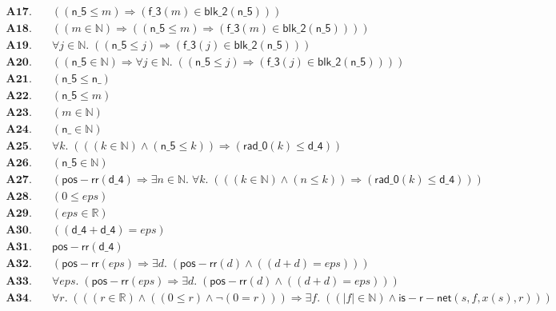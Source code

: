 \documentclass[11pt]{article}
\begin{document}
\begin{align*}
  \mathbf{A17.}\quad & ((\mathsf{n\_5} \leq m) \Rightarrow (\mathsf{f\_3}(m) \in \mathsf{blk\_2}(\mathsf{n\_5}))) \\
  \mathbf{A18.}\quad & ((m \in \mathbb{N}) \Rightarrow ((\mathsf{n\_5} \leq m) \Rightarrow (\mathsf{f\_3}(m) \in \mathsf{blk\_2}(\mathsf{n\_5})))) \\
  \mathbf{A19.}\quad & \forall j \in \mathbb{N}.\; ((\mathsf{n\_5} \leq j) \Rightarrow (\mathsf{f\_3}(j) \in \mathsf{blk\_2}(\mathsf{n\_5}))) \\
  \mathbf{A20.}\quad & ((\mathsf{n\_5} \in \mathbb{N}) \Rightarrow \forall j \in \mathbb{N}.\; ((\mathsf{n\_5} \leq j) \Rightarrow (\mathsf{f\_3}(j) \in \mathsf{blk\_2}(\mathsf{n\_5})))) \\
  \mathbf{A21.}\quad & (\mathsf{n\_5} \leq \mathsf{n\_}) \\
  \mathbf{A22.}\quad & (\mathsf{n\_5} \leq m) \\
  \mathbf{A23.}\quad & (m \in \mathbb{N}) \\
  \mathbf{A24.}\quad & (\mathsf{n\_} \in \mathbb{N}) \\
  \mathbf{A25.}\quad & \forall k.\; (((k \in \mathbb{N}) \wedge (\mathsf{n\_5} \leq k)) \Rightarrow (\mathsf{rad\_0}(k) \leq \mathsf{d\_4})) \\
  \mathbf{A26.}\quad & (\mathsf{n\_5} \in \mathbb{N}) \\
  \mathbf{A27.}\quad & (\mathsf{pos{-}rr}(\mathsf{d\_4}) \Rightarrow \exists n \in \mathbb{N}.\; \forall k.\; (((k \in \mathbb{N}) \wedge (n \leq k)) \Rightarrow (\mathsf{rad\_0}(k) \leq \mathsf{d\_4}))) \\
  \mathbf{A28.}\quad & (0 \leq \mathit{eps}) \\
  \mathbf{A29.}\quad & (\mathit{eps} \in \mathbb{R}) \\
  \mathbf{A30.}\quad & ((\mathsf{d\_4} + \mathsf{d\_4}) = \mathit{eps}) \\
  \mathbf{A31.}\quad & \mathsf{pos{-}rr}(\mathsf{d\_4}) \\
  \mathbf{A32.}\quad & (\mathsf{pos{-}rr}(\mathit{eps}) \Rightarrow \exists d.\; (\mathsf{pos{-}rr}(d) \wedge ((d + d) = \mathit{eps}))) \\
  \mathbf{A33.}\quad & \forall \mathit{eps}.\; (\mathsf{pos{-}rr}(\mathit{eps}) \Rightarrow \exists d.\; (\mathsf{pos{-}rr}(d) \wedge ((d + d) = \mathit{eps}))) \\
  \mathbf{A34.}\quad & \forall r.\; (((r \in \mathbb{R}) \wedge ((0 \leq r) \wedge \neg (0 = r))) \Rightarrow \exists f.\; ((|f| \in \mathbb{N}) \wedge \mathsf{is{-}r{-}net}(s, f, x(s), r))) \\

\end{align*}
\end{document}
